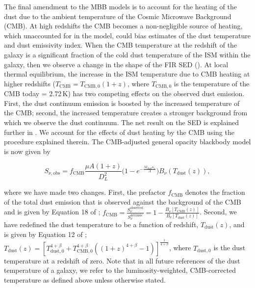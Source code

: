 The final amendment to the MBB models is to account for the heating of the dust due to the ambient temperature of the Cosmic Microwave Background (CMB). At high redshifts the CMB becomes a non-negligible source of heating, which unaccounted for in the model, could bias estimates of the dust temperature and dust emissivity index. When the CMB temperature at the redshift of the galaxy is a significant fraction of the cold dust temperature of the ISM within the galaxy, then we observe a change in the shape of the FIR SED (\citealt{daCunha_2013}). At local thermal equilibrium, the increase in the ISM temperature due to CMB heating at higher redshifts ($T_{\textrm{CMB}} = T_{\textrm{CMB}, 0}(1+z)$, where $T_{\textrm{CMB}, 0}$ is the temperature of the CMB today = 2.72\,K) has two competing effects on the observed dust emission. First, the dust continuum emission is boosted by the increased temperature of the CMB; second, the increased temperature creates a stronger background from which we observe the dust continuum. The net result on the SED is explained further in \citealt{daCunha_2013}. We account for the effects of dust heating by the CMB using the procedure explained therein. The CMB-adjusted general opacity blackbody model is now given by 

\begin{equation}
	S_{\nu, \textrm{obs}} = f_{\textrm{CMB}}\frac{\mu A (1+z)}{D_L^2}\Bigg(1 - e^{- \frac{M_{\textrm{dust}}\kappa_\nu}{A}}\Bigg) B_\nu(T_{\textrm{dust}}(z)),
		\label{eq:modified_blackbody_general_opacity_a_cmb}
\end{equation}

where we have made two changes. First, the prefactor $f_{\textrm{CMB}}$ denotes the fraction of the total dust emission that is observed against the background of the CMB and is given by Equation 18 of \citealt{daCunha_2013}; $f_{\textrm{CMB}} = \frac{S_\nu^{\textrm{observed}}}{S_\nu^{\textrm{intrinsic}}} = 1 - \frac{B_\nu[T_{\textrm{CMB}}(z)]}{B_\nu[T_{\textrm{dust}}(z)]}$. Second, we have redefined the dust temperature to be a function of redshift, $T_{\textrm{dust}}(z)$, and is given by Equation 12 of \citealt{daCunha_2013}; $T_{\textrm{dust}}(z) = [T_{\textrm{dust}, 0}^{4+\beta} + T_{\textrm{CMB}, 0}^{4+\beta} ((1+z)^{4+\beta} - 1)]^{\frac{1}{4+\beta}}$, where $T_{\textrm{dust}, 0}$ is the dust temperature at a redshift of zero. Note that in all future references of the dust temperature of a galaxy, we refer to the luminosity-weighted, CMB-corrected temperature as defined above unless otherwise stated.

